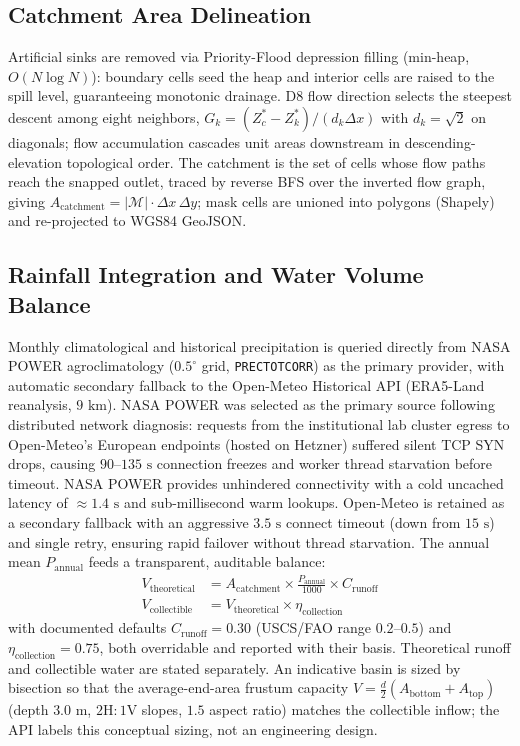 \documentclass[manuscript,screen,review]{acmart}
\begin{document}
\subsection{Catchment Area Delineation}
Artificial sinks are removed via Priority-Flood depression filling (min-heap, $O(N \log N)$): boundary cells seed the heap and interior cells are raised to the spill level, guaranteeing monotonic drainage. D8 flow direction selects the steepest descent among eight neighbors, $G_k = (Z^*_c - Z^*_k)/(d_k \Delta x)$ with $d_k = \sqrt{2}$ on diagonals; flow accumulation cascades unit areas downstream in descending-elevation topological order. The catchment is the set of cells whose flow paths reach the snapped outlet, traced by reverse BFS over the inverted flow graph, giving $A_{\text{catchment}} = |\mathcal{M}| \cdot \Delta x\, \Delta y$; mask cells are unioned into polygons (Shapely) and re-projected to WGS84 GeoJSON.

\subsection{Rainfall Integration and Water Volume Balance}
Monthly climatological and historical precipitation is queried directly from NASA POWER agroclimatology ($0.5^\circ$ grid, \texttt{PRECTOTCORR}) as the primary provider, with automatic secondary fallback to the Open-Meteo Historical API (ERA5-Land reanalysis, $9\text{ km}$). NASA POWER was selected as the primary source following distributed network diagnosis: requests from the institutional lab cluster egress to Open-Meteo's European endpoints (hosted on Hetzner) suffered silent TCP SYN drops, causing $90$--$135\text{ s}$ connection freezes and worker thread starvation before timeout. NASA POWER provides unhindered connectivity with a cold uncached latency of $\approx 1.4\text{ s}$ and sub-millisecond warm lookups. Open-Meteo is retained as a secondary fallback with an aggressive $3.5\text{ s}$ connect timeout (down from $15\text{ s}$) and single retry, ensuring rapid failover without thread starvation. The annual mean $P_{\text{annual}}$ feeds a transparent, auditable balance:
\begin{align}
    V_{\text{theoretical}} &= A_{\text{catchment}} \times \frac{P_{\text{annual}}}{1000} \times C_{\text{runoff}} \\
    V_{\text{collectible}} &= V_{\text{theoretical}} \times \eta_{\text{collection}}
\end{align}
with documented defaults $C_{\text{runoff}} = 0.30$ (USCS/FAO range $0.2$--$0.5$) and $\eta_{\text{collection}} = 0.75$, both overridable and reported with their basis. Theoretical runoff and collectible water are stated separately. An indicative basin is sized by bisection so that the average-end-area frustum capacity $V = \frac{d}{2}(A_{\text{bottom}} + A_{\text{top}})$ (depth $3.0\text{ m}$, $2\text{H}:1\text{V}$ slopes, $1.5$ aspect ratio) matches the collectible inflow; the API labels this conceptual sizing, not an engineering design.
\end{document}
